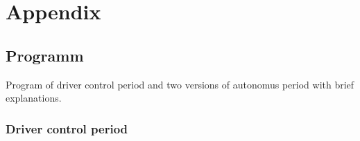 \section{Appendix}



\subsection{Programm}

Program of driver control period and two versions of autonomus period with brief explanations.
\subsubsection{Driver control period}

\begin{figure}[H]
	\begin{minipage}[h]{1\linewidth}
	\end{minipage}
\end{figure}

